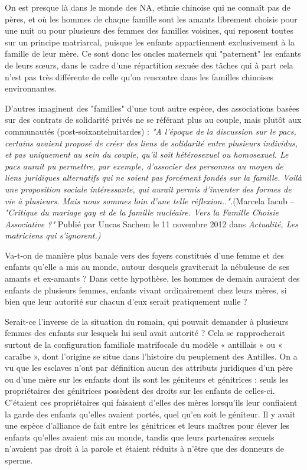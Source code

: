  On est presque là dans le monde des NA, ethnie chinoise qui ne connaît pas de pères, et où les hommes de chaque famille sont les amants librement choisis pour une nuit ou pour plusieurs des femmes des familles voisines, qui reposent toutes sur un principe matriarcal, puisque les enfants appartiennent exclusivement à la famille de leur mère. Ce sont donc les oncles maternels qui "paternent" les enfants de leurs sœurs, dans le cadre d'une répartition sexuée des tâches qui à part cela n'est pas très différente de celle qu'on rencontre dans les familles chinoises environnantes. 
 
D'autres imaginent des "familles" d'une tout autre espèce, des associations basées sur des contrats de solidarité privés ne se référant plus au couple, mais plutôt aux communautés (post-soixantehuitardes) : \emph{"A l’époque de la discussion sur le pacs, certains avaient proposé de créer des liens de solidarité entre plusieurs individus, et pas uniquement au sein du couple, qu’il soit hétérosexuel ou homosexuel. Le pacs aurait pu permettre, par exemple, d’associer des personnes au moyen de liens juridiques alternatifs qui ne soient pas forcément fondés sur la famille. Voilà une proposition sociale intéressante, qui aurait permis d’inventer des formes de vie à plusieurs. Mais nous sommes loin d’une telle réflexion..".}(Marcela Iacub – \emph{"Critique du mariage gay et de la famille nucléaire. Vers la Famille Choisie Associative ?"} 
Publié par Uncas Sachem le 11 novembre 2012 dans \emph{Actualité, Les matriciens qui s'ignorent.)} 
 
 
 Va-t-on de manière plus banale vers des foyers constitués d'une femme et des enfants qu'elle a mis au monde, autour desquels graviterait la nébuleuse de ses amants et ex-amants ? Dans cette hypothèse, les hommes de demain auraient des enfants de plusieurs femmes, enfants vivant ordinairement chez leurs mères, si bien que leur autorité sur chacun d'eux serait pratiquement nulle ? 
 
 Serait-ce l'inverse de la situation du  romain, qui pouvait demander à plusieurs femmes des enfants sur lesquels lui seul avait autorité ? Cela se rapprocherait surtout de la configuration familiale matrifocale du modèle « antillais » ou « caraïbe », dont l'origine se situe dans l'histoire du peuplement des Antilles. On a vu que les esclaves n'ont par définition aucun des attributs juridiques d'un père ou d'une mère sur les enfants dont ils sont les géniteurs et génitrices : seuls les propriétaires des génitrices possèdent des droits sur les enfants de celles-ci. C'étaient ces propriétaires qui faisaient d'elles des mères lorsqu'ils leur confiaient la garde des enfants qu'elles avaient portés, quel qu'en soit le géniteur. Il y avait une espèce d'alliance de fait entre les génitrices et leurs maîtres pour élever les enfants qu'elles avaient mis au monde, tandis que leurs partenaires sexuels n'avaient pas droit à la parole et étaient réduits à n'être que des donneurs de sperme. 
 


